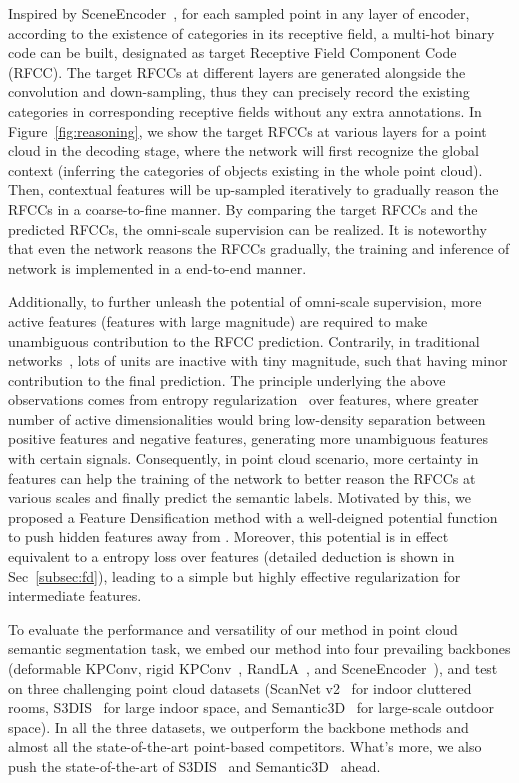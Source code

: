 \documentclass[final]{cvpr}
\begin{document}
Inspired by SceneEncoder~\cite{xu2020sceneencoder}, for each sampled point in any layer of encoder, according to the existence of categories in its receptive field, a multi-hot binary code can be built, designated as target Receptive Field Component Code (RFCC). The target RFCCs at different layers are generated alongside the convolution and down-sampling, thus they can precisely record the existing categories in corresponding receptive fields without any extra annotations. In Figure~\ref{fig:reasoning}, we show the target RFCCs at various layers for a point cloud in the decoding stage, where the network will first recognize the global context (inferring the categories of objects existing in the whole point cloud). Then, contextual features will be up-sampled iteratively to gradually reason the RFCCs in a coarse-to-fine manner. By comparing the target RFCCs and the predicted RFCCs, the omni-scale supervision can be realized. It is noteworthy that even the network reasons the RFCCs gradually, the training and inference of network is implemented in a end-to-end manner.








Additionally, to further unleash the potential of omni-scale supervision, more active features (features with large magnitude) are required to make unambiguous contribution to the RFCC prediction. Contrarily, in traditional networks~\cite{wu2019pointconv,thomas2019kpconv,xu2020sceneencoder}, lots of units are inactive with tiny magnitude, such that having minor contribution to the final prediction. The principle underlying the above observations comes from entropy regularization~\cite{grandvalet2005semi,lee2013pseudo} over features, where greater number of active dimensionalities would bring low-density separation between positive features and negative features, generating more unambiguous features with certain signals. Consequently, in point cloud scenario, more certainty in features can help the training of the network to better reason the RFCCs at various scales and finally predict the semantic labels. Motivated by this, we proposed a Feature Densification method with a well-deigned potential function to push hidden features away from . Moreover, this potential is in effect equivalent to a entropy loss over features (detailed deduction is shown in Sec~\ref{subsec:fd}), leading to a simple but highly effective regularization for intermediate features.

To evaluate the performance and versatility of our method in point cloud semantic segmentation task, we embed our method into four prevailing backbones (deformable KPConv, rigid KPConv~\cite{thomas2019kpconv}, RandLA~\cite{hu2020randla}, and SceneEncoder~\cite{xu2020sceneencoder}), and test on three challenging point cloud datasets (ScanNet v2~\cite{dai2017scannet} for indoor cluttered rooms, S3DIS~\cite{armeni20163d} for large indoor space, and Semantic3D~\cite{hackel2017semantic3d} for large-scale outdoor space). In all the three datasets, we outperform the backbone methods and almost all the state-of-the-art point-based competitors. What's more, we also push the state-of-the-art of S3DIS~\cite{armeni20163d} and Semantic3D~\cite{hackel2017semantic3d} ahead.
\end{document}
